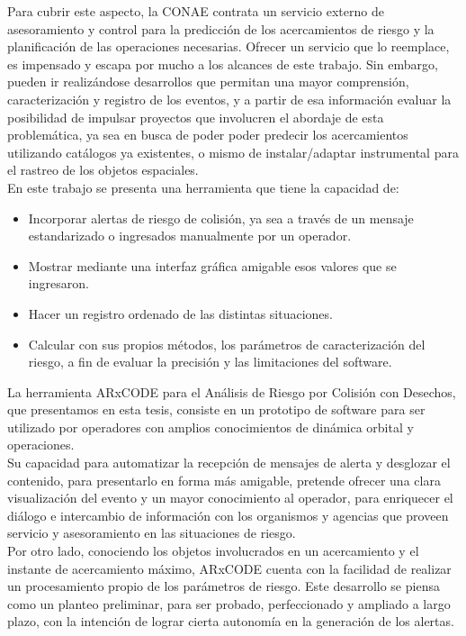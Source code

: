 Para cubrir este aspecto, la CONAE contrata un servicio externo de asesoramiento y control para la predicci\'on de los acercamientos de riesgo y la planificaci\'on de las operaciones necesarias. Ofrecer un servicio que lo reemplace, es impensado y escapa por mucho a los alcances de este trabajo. Sin embargo, pueden ir realiz\'andose desarrollos que permitan una mayor comprensi\'on,  caracterizaci\'on y registro de los eventos, y a partir de esa informaci\'on evaluar la posibilidad de impulsar proyectos que involucren el abordaje de esta problem\'atica, ya sea en busca de poder poder predecir los acercamientos utilizando cat\'alogos ya existentes, o mismo de instalar/adaptar instrumental para el rastreo de los objetos espaciales.\\


En este trabajo se presenta una herramienta que tiene la capacidad de:

\begin{itemize}
\item Incorporar alertas de riesgo de colisi\'on, ya sea a trav\'es de un mensaje estandarizado o ingresados manualmente por un operador.
\item Mostrar mediante una interfaz gr\'afica amigable esos valores que se ingresaron.
\item Hacer un registro ordenado de las distintas situaciones.
\item Calcular con sus propios m\'etodos, los par\'ametros de caracterizaci\'on del riesgo, a fin de evaluar la precisi\'on y las limitaciones del software.\\
\end{itemize}

La herramienta ARxCODE para el An\'alisis de Riesgo por Colisi\'on con Desechos, que presentamos en esta tesis, consiste en un prototipo de software para ser utilizado por operadores con amplios conocimientos de din\'amica orbital y operaciones.\\

Su capacidad para automatizar la recepci\'on de mensajes de alerta y desglozar el contenido, para presentarlo en forma m\'as amigable, pretende ofrecer una clara visualizaci\'on del evento y un mayor conocimiento al operador, para enriquecer el di\'alogo e intercambio de informaci\'on con los organismos y agencias que proveen servicio y asesoramiento en las situaciones de riesgo.\\

Por otro lado, conociendo los objetos involucrados en un acercamiento y el instante de acercamiento m\'aximo, ARxCODE cuenta con la facilidad de realizar un procesamiento propio de los par\'ametros de riesgo. Este desarrollo se piensa como un planteo preliminar, para ser probado, perfeccionado y ampliado a largo plazo, con la intenci\'on de lograr cierta autonom\'ia en la generaci\'on de los alertas.\\

